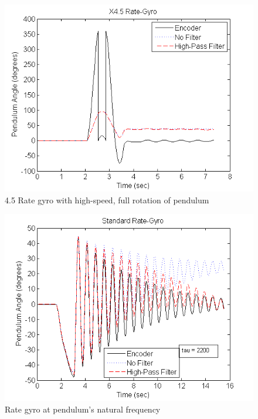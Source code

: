 \documentclass{article}
\theoremstyle{plain}
\theoremstyle{definition}
\theoremstyle{remark}
\begin{document}
\begin{figure}[hbt]
\begin{center}
\includegraphics[width = 12cm]{FullRotation_Gyro45.png}
\caption{4.5 Rate gyro with high-speed, full rotation of pendulum}
\label{full_gyro45}
\end{center}
\end{figure}

\begin{figure}[hbt]
\begin{center}
\includegraphics[width = 12cm]{NormalMass_Gyro.png}
\caption{Rate gyro at pendulum's natural frequency}
\label{normal_gyro}
\end{center}
\end{figure}
\end{document}
